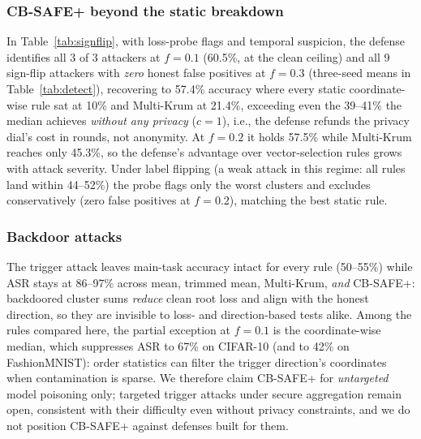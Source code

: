 \documentclass[lettersize,journal]{IEEEtran}
\begin{document}
\subsubsection{CB-SAFE+ beyond the static breakdown} In
Table~\ref{tab:signflip}, with loss-probe
flags and temporal suspicion, the defense identifies all 3 of 3 attackers at
$f{=}0.1$ (60.5\%, at the clean ceiling) and all 9 sign-flip attackers
with \emph{zero} honest false positives at $f{=}0.3$ (three-seed means in Table~\ref{tab:detect}), recovering to 57.4\%
accuracy where every static coordinate-wise rule sat at 10\% and Multi-Krum at
21.4\%, exceeding even the 39--41\% the median achieves \emph{without any privacy}
($c{=}1$), i.e., the defense refunds the privacy dial's cost in rounds, not
anonymity. At $f{=}0.2$ it holds 57.5\% while Multi-Krum reaches only 45.3\%, so the
defense's advantage over vector-selection rules grows with attack severity.
Under label flipping (a weak attack in this regime: all rules land within
44--52\%) the probe flags only the worst clusters and excludes conservatively (zero
false positives at $f{=}0.2$), matching the best static rule.

\subsubsection{Backdoor attacks} The trigger attack leaves
main-task accuracy intact for every rule (50--55\%) while ASR stays at 86--97\%
across mean, trimmed mean, Multi-Krum, \emph{and} CB-SAFE+:
backdoored cluster sums \emph{reduce} clean root loss
and align with the honest direction, so they are invisible to loss- and
direction-based tests alike. Among the rules compared here, the partial exception at
$f{=}0.1$ is the coordinate-wise median, which suppresses ASR to 67\% on CIFAR-10
(and to 42\% on FashionMNIST): order statistics can filter the trigger direction's
coordinates when contamination is sparse. We therefore claim CB-SAFE+ for \emph{untargeted} model
poisoning only; targeted trigger attacks under secure aggregation remain open,
consistent with their difficulty even without privacy constraints, and we do not
position CB-SAFE+ against defenses built for them.
\end{document}
